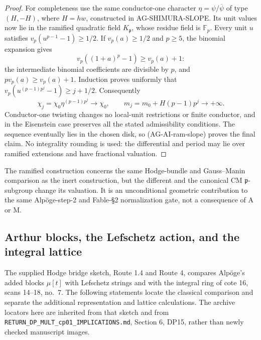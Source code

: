 \begin{proof}
For completeness use the same conductor-one character
$\eta=\psi/\overline\psi$ of type $(H,-H)$, where $H=hw$,
constructed in AG-SHIMURA-SLOPE.  Its unit values now lie in
the ramified quadratic field $K_{\mathfrak p}$, whose residue
field is $\mathbb F_p$.  Every unit $u$ satisfies
$v_p(u^{p-1}-1)\geq1/2$.  If $v_p(a)\geq1/2$ and $p\geq5$,
the binomial expansion gives
\[
 v_p((1+a)^p-1)\geq v_p(a)+1:
\]
the intermediate binomial coefficients are divisible by $p$,
and $p v_p(a)\geq v_p(a)+1$.  Induction proves uniformly that
$v_p(u^{(p-1)p^j}-1)\geq j+1/2$.
Consequently
\[
 \chi_j=\chi_0\eta^{(p-1)p^j}\longrightarrow\chi_0,
 \qquad m_j=m_0+H(p-1)p^j\longrightarrow+\infty.
\]
Conductor-one twisting changes no local-unit restrictions or
finite conductor, and in the Eisenstein case preserves all the
stated admissibility conditions.  The sequence eventually lies
in the chosen disk, so (AG-AI-ram-slope) proves the final claim.
No integrality rounding is used: the differential and period
may lie over ramified extensions and have fractional valuation.
\end{proof}

The ramified construction concerns the same Hodge-bundle and
Gauss--Manin comparison as the inert construction, but the
different and the canonical CM $\mathfrak p$-subgroup change
its valuation.  It is an unconditional geometric contribution
to the same Alpöge-step-2 and Fable-\S2 normalization gate,
not a consequence of A or M.

\subsection{Arthur blocks, the Lefschetz action, and the integral lattice}
\label{ag:arthur}

The supplied Hodge bridge sketch, Route 1.4 and Route 4, compares
Alpöge's added blocks $\mu[t]$ with Lefschetz strings and with the
integral ring of cote 16, scans 14--18, no.~7. The following
statements locate the classical comparison and separate the
additional representation and lattice calculations. The archive
locators here are inherited from that sketch and from
\texttt{RETURN\_DP\_MULT\_cp01\_IMPLICATIONS.md}, Section 6,
DP15, rather than newly checked manuscript images.

